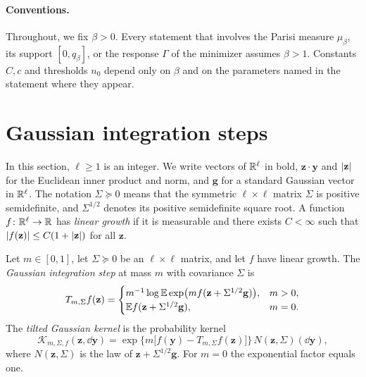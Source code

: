 \paragraph{Conventions.}
Throughout, we fix $\beta>0$. Every statement that involves the
Parisi measure $\mu_\beta$, its support $[0,q_\beta]$, or the response $\Gamma$ of
the minimizer assumes $\beta>1$. Constants $C,c$ and thresholds $n_0$ depend only
on $\beta$ and on the parameters named in the statement where they appear.

\section{Gaussian integration steps}\label{sec:inp-steps}

In this section, $\ell\ge1$ is an integer. We write vectors of $\mathbb R^\ell$ in bold,
$\mathbf z\cdot\mathbf y$ and $\lvert \mathbf z\rvert$ for the Euclidean inner product
and norm, and $\mathbf g$ for a standard Gaussian vector in $\mathbb R^\ell$. The notation
$\Sigma\succeq0$ means that the symmetric $\ell\times\ell$ matrix $\Sigma$ is
positive semidefinite, and $\Sigma^{1/2}$ denotes its positive semidefinite
square root. A function $f\colon\mathbb R^\ell\to\mathbb R$ has \emph{linear growth} if it is
measurable and there exists $C<\infty$ such that $\lvert f(\mathbf z)\rvert\le
C(1+\lvert \mathbf z\rvert)$ for all $\mathbf z$.

\begin{definition}\label{def:inp-step}
Let $m\in[0,1]$, let $\Sigma\succeq0$ be an $\ell\times\ell$ matrix, and let $f$
have linear growth. The \emph{Gaussian integration step} at mass $m$ with
covariance $\Sigma$ is
\begin{equation}\label{eq:inp-step}
 T_{m,\Sigma}f(\mathbf z)=
 \begin{cases}
  m^{-1}\log\mathbb E\exp\bigl(mf(\mathbf z+\Sigma^{1/2}\mathbf g)\bigr), & m>0,\\
  \mathbb E f(\mathbf z+\Sigma^{1/2}\mathbf g), & m=0.
 \end{cases}
\end{equation}
The \emph{tilted Gaussian kernel} is the probability kernel
\begin{equation}\label{eq:inp-kernel}
 \mathcal K_{m,\Sigma,f}(\mathbf z,\dd\mathbf y)
 =\exp\bigl\{m\bigl[f(\mathbf y)-T_{m,\Sigma}f(\mathbf z)\bigr]\bigr\}\,
  N(\mathbf z,\Sigma)(\dd\mathbf y),
\end{equation}
where $N(\mathbf z,\Sigma)$ is the law of $\mathbf z+\Sigma^{1/2}\mathbf g$. For
$m=0$ the exponential factor equals one.
\end{definition}

